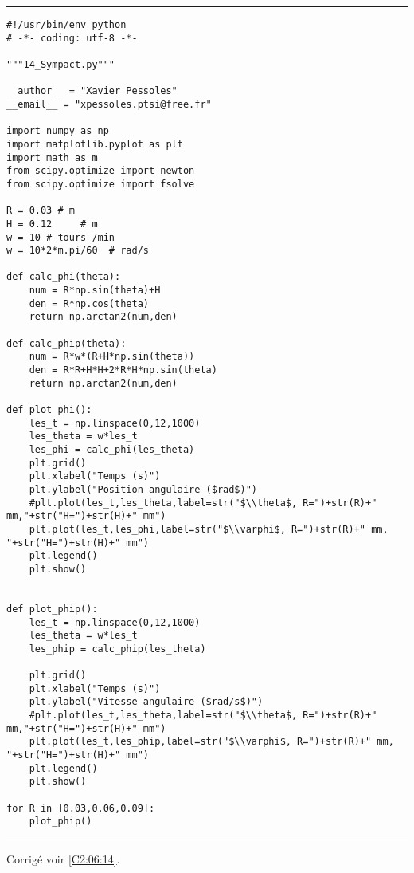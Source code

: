 \noindent\hrule
\begin{lstlisting}
#!/usr/bin/env python
# -*- coding: utf-8 -*-

"""14_Sympact.py"""

__author__ = "Xavier Pessoles"
__email__ = "xpessoles.ptsi@free.fr"

import numpy as np
import matplotlib.pyplot as plt
import math as m
from scipy.optimize import newton
from scipy.optimize import fsolve

R = 0.03 # m
H = 0.12     # m
w = 10 # tours /min
w = 10*2*m.pi/60  # rad/s

def calc_phi(theta):
    num = R*np.sin(theta)+H
    den = R*np.cos(theta)
    return np.arctan2(num,den)

def calc_phip(theta):
    num = R*w*(R+H*np.sin(theta))
    den = R*R+H*H+2*R*H*np.sin(theta)
    return np.arctan2(num,den)

def plot_phi():
    les_t = np.linspace(0,12,1000)
    les_theta = w*les_t
    les_phi = calc_phi(les_theta)
    plt.grid()
    plt.xlabel("Temps (s)")
    plt.ylabel("Position angulaire ($rad$)")
    #plt.plot(les_t,les_theta,label=str("$\\theta$, R=")+str(R)+" mm,"+str("H=")+str(H)+" mm")
    plt.plot(les_t,les_phi,label=str("$\\varphi$, R=")+str(R)+" mm, "+str("H=")+str(H)+" mm")
    plt.legend()
    plt.show()


def plot_phip():
    les_t = np.linspace(0,12,1000)
    les_theta = w*les_t
    les_phip = calc_phip(les_theta)
    
    plt.grid()
    plt.xlabel("Temps (s)")
    plt.ylabel("Vitesse angulaire ($rad/s$)")
    #plt.plot(les_t,les_theta,label=str("$\\theta$, R=")+str(R)+" mm,"+str("H=")+str(H)+" mm")
    plt.plot(les_t,les_phip,label=str("$\\varphi$, R=")+str(R)+" mm, "+str("H=")+str(H)+" mm")
    plt.legend()
    plt.show()

for R in [0.03,0.06,0.09]:
    plot_phip()
\end{lstlisting}
\noindent\hrule

\ifprof
\else
\fi


\ifprof
\else
\begin{flushright}
\footnotesize{Corrigé  voir \ref{C2:06:14}.}
\end{flushright}%
\fi